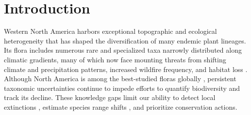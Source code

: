 \documentclass[11pt]{article}
\begin{document}
\section*{Introduction}
Western North America harbors exceptional topographic and ecological heterogeneity
that has shaped the diversification of many endemic plant lineages.
Its flora includes numerous rare and specialized taxa narrowly distributed
along climatic gradients, many of which now face mounting threats from shifting
climate and precipitation patterns, increased wildfire frequency, and habitat loss
\citep{kannenberg_rapid_2021,overpeck_climate_2020}.
% 
Although North America is among the best-studied floras globally
 \citep{hickman1993jepson,FNA_Vol3_1997,cronquist_intermountain_1984}, 
persistent taxonomic uncertainties continue to
impede efforts to quantify biodiversity and track its decline. 
% 
These knowledge gaps limit our ability to detect 
local extinctions \citep{wiens_climate-related_2016},
estimate species range shifts \citep{frei_plant_2010}, 
and prioritize conservation actions.
\end{document}
